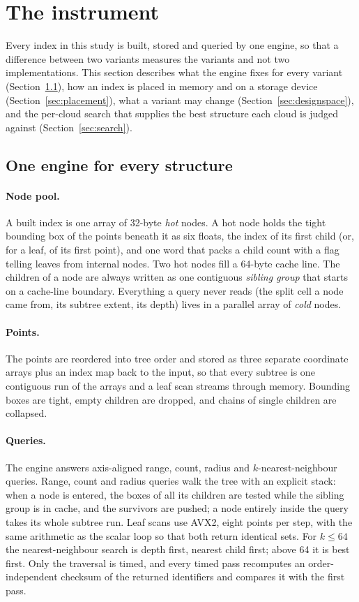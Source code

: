 \section{The instrument}\label{sec:instrument}

Every index in this study is built, stored and queried by one engine, so that a difference between two variants measures the variants and not two implementations. This section describes what the engine fixes for every variant (Section~\ref{sec:engine}), how an index is placed in memory and on a storage device (Section~\ref{sec:placement}), what a variant may change (Section~\ref{sec:designspace}), and the per-cloud search that supplies the best structure each cloud is judged against (Section~\ref{sec:search}).

\subsection{One engine for every structure}\label{sec:engine}

\paragraph{Node pool.} A built index is one array of 32-byte \emph{hot} nodes. A hot node holds the tight bounding box of the points beneath it as six floats, the index of its first child (or, for a leaf, of its first point), and one word that packs a child count with a flag telling leaves from internal nodes. Two hot nodes fill a 64-byte cache line. The children of a node are always written as one contiguous \emph{sibling group} that starts on a cache-line boundary. Everything a query never reads (the split cell a node came from, its subtree extent, its depth) lives in a parallel array of \emph{cold} nodes.

\paragraph{Points.} The points are reordered into tree order and stored as three separate coordinate arrays plus an index map back to the input, so that every subtree is one contiguous run of the arrays and a leaf scan streams through memory. Bounding boxes are tight, empty children are dropped, and chains of single children are collapsed.

\paragraph{Queries.} The engine answers axis-aligned range, count, radius and $k$-nearest-neighbour queries. Range, count and radius queries walk the tree with an explicit stack: when a node is entered, the boxes of all its children are tested while the sibling group is in cache, and the survivors are pushed; a node entirely inside the query takes its whole subtree run. Leaf scans use AVX2, eight points per step, with the same arithmetic as the scalar loop so that both return identical sets. For $k \leq 64$ the nearest-neighbour search is depth first, nearest child first; above 64 it is best first. Only the traversal is timed, and every timed pass recomputes an order-independent checksum of the returned identifiers and compares it with the first pass.

